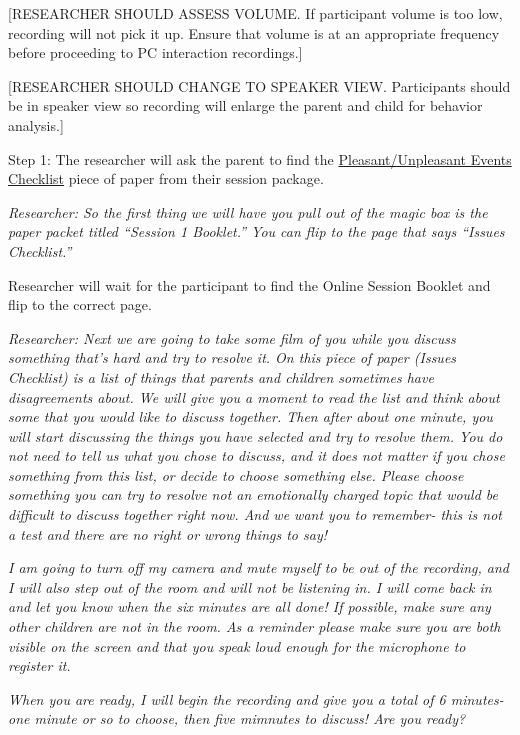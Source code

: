 \documentclass[]{book}
\begin{document}
{[}RESEARCHER SHOULD ASSESS VOLUME. If participant volume is too low, recording will not pick it up. Ensure that volume is at an appropriate frequency before proceeding to PC interaction recordings.{]}

{[}RESEARCHER SHOULD CHANGE TO SPEAKER VIEW. Participants should be in speaker view so recording will enlarge the parent and child for behavior analysis.{]}

Step 1:
The researcher will ask the parent to find the \href{https://ucla.app.box.com/file/630327764749}{Pleasant/Unpleasant Events Checklist} piece of paper from their session package.

\emph{Researcher: So the first thing we will have you pull out of the magic box is the paper packet titled ``Session 1 Booklet.'' You can flip to the page that says ``Issues Checklist.''}

Researcher will wait for the participant to find the Online Session Booklet and flip to the correct page.

\emph{Researcher: Next we are going to take some film of you while you discuss something that's hard and try to resolve it. On this piece of paper (Issues Checklist) is a list of things that parents and children sometimes have disagreements about. We will give you a moment to read the list and think about some that you would like to discuss together. Then after about one minute, you will start discussing the things you have selected and try to resolve them. You do not need to tell us what you chose to discuss, and it does not matter if you chose something from this list, or decide to choose something else. Please choose something you can try to resolve not an emotionally charged topic that would be difficult to discuss together right now. And we want you to remember- this is not a test and there are no right or wrong things to say!}

\emph{I am going to turn off my camera and mute myself to be out of the recording, and I will also step out of the room and will not be listening in. I will come back in and let you know when the six minutes are all done! If possible, make sure any other children are not in the room. As a reminder please make sure you are both visible on the screen and that you speak loud enough for the microphone to register it.}

\emph{When you are ready, I will begin the recording and give you a total of 6 minutes- one minute or so to choose, then five mimnutes to discuss! Are you ready?}
\end{document}
